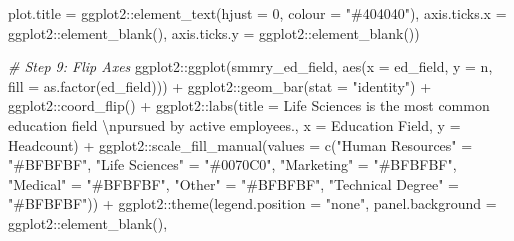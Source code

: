 \documentclass[
]{book}
\newenvironment{Shaded}{\begin{snugshade}}{\end{snugshade}}
\newcommand{\AttributeTok}[1]{\textcolor[rgb]{0.77,0.63,0.00}{#1}}
\newcommand{\CommentTok}[1]{\textcolor[rgb]{0.56,0.35,0.01}{\textit{#1}}}
\newcommand{\DecValTok}[1]{\textcolor[rgb]{0.00,0.00,0.81}{#1}}
\newcommand{\FunctionTok}[1]{\textcolor[rgb]{0.00,0.00,0.00}{#1}}
\newcommand{\NormalTok}[1]{#1}
\newcommand{\OtherTok}[1]{\textcolor[rgb]{0.56,0.35,0.01}{#1}}
\newcommand{\SpecialCharTok}[1]{\textcolor[rgb]{0.00,0.00,0.00}{#1}}
\newcommand{\StringTok}[1]{\textcolor[rgb]{0.31,0.60,0.02}{#1}}
\begin{document}
\begin{Shaded}
\begin{Highlighting}[]
               \AttributeTok{plot.title =}\NormalTok{ ggplot2}\SpecialCharTok{::}\FunctionTok{element\_text}\NormalTok{(}\AttributeTok{hjust =} \DecValTok{0}\NormalTok{, }\AttributeTok{colour =} \StringTok{"\#404040"}\NormalTok{),}
               \AttributeTok{axis.ticks.x =}\NormalTok{ ggplot2}\SpecialCharTok{::}\FunctionTok{element\_blank}\NormalTok{(),}
               \AttributeTok{axis.ticks.y =}\NormalTok{ ggplot2}\SpecialCharTok{::}\FunctionTok{element\_blank}\NormalTok{())}

\CommentTok{\# Step 9: Flip Axes}
\NormalTok{ggplot2}\SpecialCharTok{::}\FunctionTok{ggplot}\NormalTok{(smmry\_ed\_field, }\FunctionTok{aes}\NormalTok{(}\AttributeTok{x =}\NormalTok{ ed\_field, }\AttributeTok{y =}\NormalTok{ n, }\AttributeTok{fill =} \FunctionTok{as.factor}\NormalTok{(ed\_field))) }\SpecialCharTok{+}
\NormalTok{ggplot2}\SpecialCharTok{::}\FunctionTok{geom\_bar}\NormalTok{(}\AttributeTok{stat =} \StringTok{"identity"}\NormalTok{) }\SpecialCharTok{+}
\NormalTok{ggplot2}\SpecialCharTok{::}\FunctionTok{coord\_flip}\NormalTok{() }\SpecialCharTok{+}
\NormalTok{ggplot2}\SpecialCharTok{::}\FunctionTok{labs}\NormalTok{(}\AttributeTok{title =} \StringTok{\textquotesingle{}Life Sciences is the most common education field }\SpecialCharTok{\textbackslash{}n}\StringTok{pursued by active employees.\textquotesingle{}}\NormalTok{, }\AttributeTok{x =} \StringTok{\textquotesingle{}Education Field\textquotesingle{}}\NormalTok{, }\AttributeTok{y =} \StringTok{\textquotesingle{}Headcount\textquotesingle{}}\NormalTok{) }\SpecialCharTok{+}
\NormalTok{ggplot2}\SpecialCharTok{::}\FunctionTok{scale\_fill\_manual}\NormalTok{(}\AttributeTok{values =} \FunctionTok{c}\NormalTok{(}\StringTok{"Human Resources"} \OtherTok{=} \StringTok{"\#BFBFBF"}\NormalTok{, }
                                      \StringTok{"Life Sciences"} \OtherTok{=} \StringTok{"\#0070C0"}\NormalTok{, }
                                      \StringTok{"Marketing"} \OtherTok{=} \StringTok{"\#BFBFBF"}\NormalTok{, }
                                      \StringTok{"Medical"} \OtherTok{=} \StringTok{"\#BFBFBF"}\NormalTok{,}
                                      \StringTok{"Other"} \OtherTok{=} \StringTok{"\#BFBFBF"}\NormalTok{,}
                                      \StringTok{"Technical Degree"} \OtherTok{=} \StringTok{"\#BFBFBF"}\NormalTok{)) }\SpecialCharTok{+}
\NormalTok{ggplot2}\SpecialCharTok{::}\FunctionTok{theme}\NormalTok{(}\AttributeTok{legend.position =} \StringTok{"none"}\NormalTok{,}
               \AttributeTok{panel.background =}\NormalTok{ ggplot2}\SpecialCharTok{::}\FunctionTok{element\_blank}\NormalTok{(),}

\end{Highlighting}
\end{Shaded}
\end{document}
